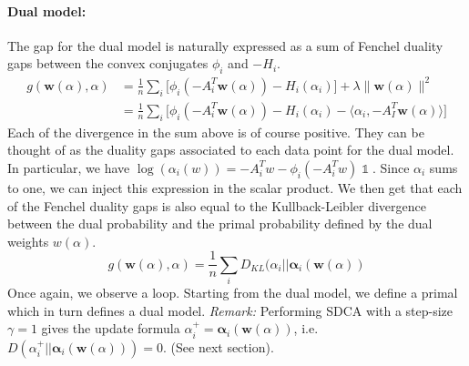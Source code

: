 \documentclass{article}
\DeclareMathOperator{\1}{\mathbb{1}}
\begin{document}
\paragraph{Dual model:}
The gap for the dual model is naturally expressed as a sum of Fenchel duality gaps between the convex conjugates $\phi_i$ and $-H_i$. 
\begin{align*}
	g(\bm w(\alpha),\alpha) 
	& = \frac{1}{n} \sum_i \big [ \phi_i(-A_i^T \bm w(\alpha)) - H_i(\alpha_i) \big ] + \lambda \|\bm w(\alpha)\|^2 \\
	& =  \frac{1}{n} \sum_i \big [ \phi_i(-A_i^T \bm w(\alpha)) - H_i(\alpha_i) - \langle \alpha_i,  -A_I^T \bm w(\alpha) \rangle \big ]
\end{align*}
Each of the divergence in the sum above is of course positive.
They can be thought of as the duality gaps associated to each data point for the dual model.
In particular, we have $\log(\alpha_i(w)) = -A_i^Tw - \phi_i(-A_i^Tw) \1$. Since $\alpha_i$ sums to one, we can inject this expression in the scalar product. We then get that each of the Fenchel duality gaps is also equal to the Kullback-Leibler divergence between the dual probability and the primal probability defined by the dual weights $w(\alpha)$.
\begin{equation}
	\label{dual duality gaps}
	g(\bm w(\alpha),\alpha) = \frac{1}{n} \sum_i D_{KL} (\alpha_i || \bm \alpha_i(\bm w(\alpha))
\end{equation}
Once again, we observe a loop. Starting from the dual model, we define a primal which in turn defines a dual model.
\textit{Remark:} Performing SDCA with a step-size $\gamma=1$ gives the update formula $\alpha_i^+ = \bm \alpha_i(\bm w(\alpha))$, i.e. $ D(\alpha_i^+ || \bm \alpha_i(\bm w(\alpha)) )=0$. (See next section).

\end{document}
